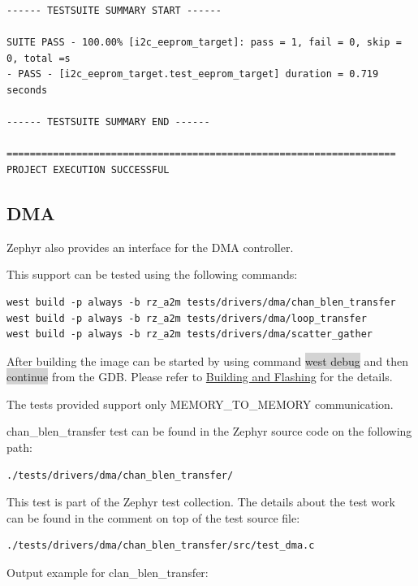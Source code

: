 \documentclass[11pt,a4paper,oneside]{article}
\begin{document}
\begin{lstlisting}
------ TESTSUITE SUMMARY START ------

SUITE PASS - 100.00% [i2c_eeprom_target]: pass = 1, fail = 0, skip = 0, total =s
- PASS - [i2c_eeprom_target.test_eeprom_target] duration = 0.719 seconds

------ TESTSUITE SUMMARY END ------

===================================================================
PROJECT EXECUTION SUCCESSFUL
\end{lstlisting}

\subsection{DMA}\label{dma}

Zephyr also provides an interface for the DMA controller.

This support can be tested using the following commands:

\begin{lstlisting}
west build -p always -b rz_a2m tests/drivers/dma/chan_blen_transfer
west build -p always -b rz_a2m tests/drivers/dma/loop_transfer
west build -p always -b rz_a2m tests/drivers/dma/scatter_gather
\end{lstlisting}

After building the image can be started by using command \colorbox{lightgray}{west debug}
and then \colorbox{lightgray}{continue} from the GDB. Please refer to
\hyperref[building-and-flashing]{Building and Flashing} for the
details.

The tests provided support only MEMORY\_TO\_MEMORY communication.

chan\_blen\_transfer test can be found in the Zephyr source code on the
following path:

\begin{lstlisting}
./tests/drivers/dma/chan_blen_transfer/
\end{lstlisting}

This test is part of the Zephyr test collection. The details about the
test work can be found in the comment on top of the test source file:
\begin{lstlisting}
./tests/drivers/dma/chan_blen_transfer/src/test_dma.c
\end{lstlisting}

Output example for clan\_blen\_transfer:
\end{document}
